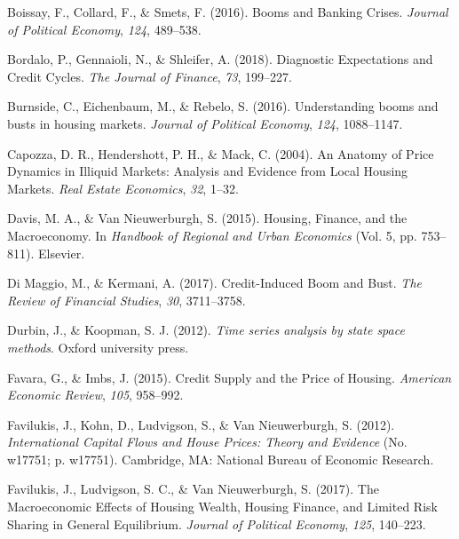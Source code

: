 \documentclass[
  12pt,
]{article}
\newlength{\cslhangindent}
\newlength{\cslentryspacingunit} %
\newenvironment{CSLReferences}[2] %
 {%
  \setlength{\parindent}{0pt}
  \ifodd #1
  \let\oldpar\par
  \def\par{\hangindent=\cslhangindent\oldpar}
  \fi
  \setlength{\parskip}{#2\cslentryspacingunit}
 }%
 {}
\begin{document}
\begin{CSLReferences}{1}{0}
\leavevmode{}%
Boissay, F., Collard, F., \& Smets, F. (2016). Booms and {Banking Crises}. \emph{Journal of Political Economy}, \emph{124}, 489--538.

\leavevmode{}%
Bordalo, P., Gennaioli, N., \& Shleifer, A. (2018). Diagnostic {Expectations} and {Credit Cycles}. \emph{The Journal of Finance}, \emph{73}, 199--227.

\leavevmode{}%
Burnside, C., Eichenbaum, M., \& Rebelo, S. (2016). Understanding booms and busts in housing markets. \emph{Journal of Political Economy}, \emph{124}, 1088--1147.

\leavevmode{}%
Capozza, D. R., Hendershott, P. H., \& Mack, C. (2004). An {Anatomy} of {Price Dynamics} in {Illiquid Markets}: {Analysis} and {Evidence} from {Local Housing Markets}. \emph{Real Estate Economics}, \emph{32}, 1--32.

\leavevmode{}%
Davis, M. A., \& Van Nieuwerburgh, S. (2015). Housing, {Finance}, and the {Macroeconomy}. In \emph{Handbook of {Regional} and {Urban Economics}} (Vol. 5, pp. 753--811). {Elsevier}.

\leavevmode{}%
Di Maggio, M., \& Kermani, A. (2017). Credit-{Induced Boom} and {Bust}. \emph{The Review of Financial Studies}, \emph{30}, 3711--3758.

\leavevmode{}%
Durbin, J., \& Koopman, S. J. (2012). \emph{Time series analysis by state space methods}. {Oxford university press}.

\leavevmode{}%
Favara, G., \& Imbs, J. (2015). Credit {Supply} and the {Price} of {Housing}. \emph{American Economic Review}, \emph{105}, 958--992.

\leavevmode{}%
Favilukis, J., Kohn, D., Ludvigson, S., \& Van Nieuwerburgh, S. (2012). \emph{International {Capital Flows} and {House Prices}: {Theory} and {Evidence}} (No. w17751; p. w17751). {Cambridge, MA}: {National Bureau of Economic Research}.

\leavevmode{}%
Favilukis, J., Ludvigson, S. C., \& Van Nieuwerburgh, S. (2017). The {Macroeconomic Effects} of {Housing Wealth}, {Housing Finance}, and {Limited Risk Sharing} in {General Equilibrium}. \emph{Journal of Political Economy}, \emph{125}, 140--223.


\end{CSLReferences}
\end{document}
